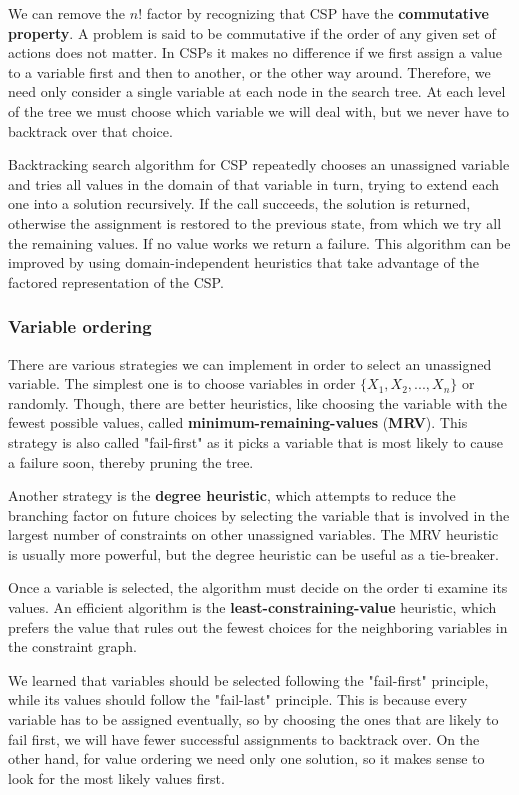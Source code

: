 \documentclass{article}
\begin{document}
We can remove the \(n!\) factor by recognizing that CSP have the \textbf{commutative property}. A problem is said to be commutative if the order of any given set of actions does not matter. In CSPs it makes no difference if we first assign a value to a variable first and then to another, or the other way around. Therefore, we need only consider a single variable at each node in the search tree. At each level of the tree we must choose which variable we will deal with, but we never have to backtrack over that choice. 

Backtracking search algorithm for CSP repeatedly chooses an unassigned variable and tries all values in the domain of that variable in turn, trying to extend each one into a solution recursively. If the call succeeds, the solution is returned, otherwise the assignment is restored to the previous state, from which we try all the remaining values. If no value works we return a failure. This algorithm can be improved by using domain-independent heuristics that take advantage of the factored representation of the CSP.

\subsubsection{Variable ordering}
There are various strategies we can implement in order to select an unassigned variable. The simplest one is to choose variables in order \(\{X_1, X_2, ..., X_n\}\) or randomly. Though, there are better heuristics, like choosing the variable with the fewest possible values, called \textbf{minimum-remaining-values} (\textbf{MRV}). This strategy is also called "fail-first" as it picks a variable that is most likely to cause a failure soon, thereby pruning the tree.

Another strategy is the \textbf{degree heuristic}, which attempts to reduce the branching factor on future choices by selecting the variable that is involved in the largest number of constraints on other unassigned variables. The MRV heuristic is usually more powerful, but the degree heuristic can be useful as a tie-breaker.

Once a variable is selected, the algorithm must decide on the order ti examine its values. An efficient algorithm is the \textbf{least-constraining-value} heuristic, which prefers the value that rules out the fewest choices for the neighboring variables in the constraint graph.

We learned that variables should be selected following the "fail-first" principle, while its values should follow the "fail-last" principle. This is because every variable has to be assigned eventually, so by choosing the ones that are likely to fail first, we will have fewer successful assignments to backtrack over. On the other hand, for value ordering we need only one solution, so it makes sense to look for the most likely values first.
\end{document}
